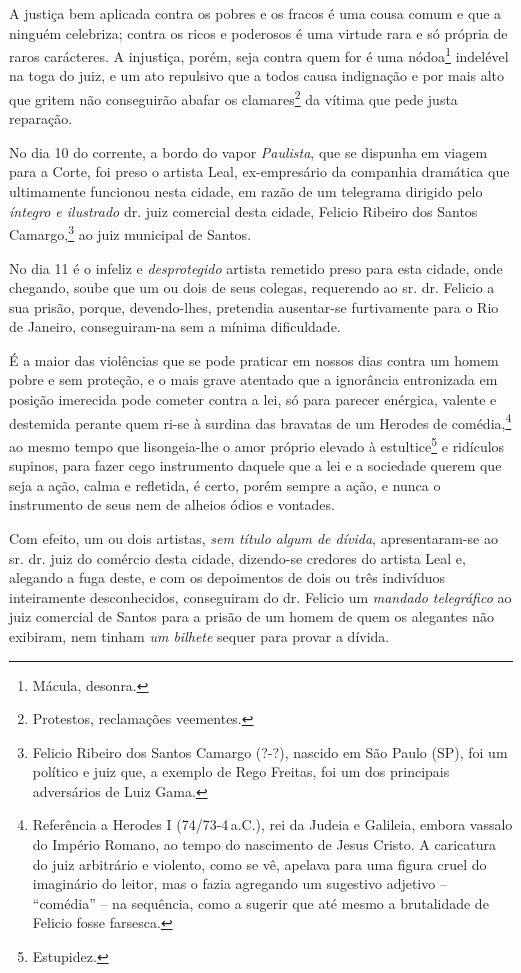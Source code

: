 A justiça bem aplicada contra os pobres e os fracos é uma cousa comum e
que a ninguém celebriza; contra os ricos e poderosos é uma virtude rara
e só própria de raros carácteres. A injustiça, porém, seja contra quem
for é uma nódoa\footnote{ Mácula, desonra.} indelével na toga do juiz,
e um ato repulsivo que a todos causa indignação e por mais alto que
gritem não conseguirão abafar os clamares\footnote{ Protestos,
  reclamações veementes.} da vítima que pede justa reparação.

No dia 10 do corrente, a bordo do vapor \emph{Paulista}, que se dispunha
em viagem para a Corte, foi preso o artista Leal, ex-empresário da
companhia dramática que ultimamente funcionou nesta cidade, em razão de
um telegrama dirigido pelo \emph{íntegro e ilustrado} dr. juiz comercial
desta cidade, Felicio Ribeiro dos Santos Camargo,\footnote{ Felicio
  Ribeiro dos Santos Camargo (?-?), nascido em São Paulo (SP), foi um
  político e juiz que, a exemplo de Rego Freitas, foi um dos principais
  adversários de Luiz Gama.} ao juiz municipal de Santos.

No dia 11 é o infeliz e \emph{desprotegido} artista remetido preso para
esta cidade, onde chegando, soube que um ou dois de seus colegas,
requerendo ao sr. dr. Felicio a sua prisão, porque, devendo-lhes,
pretendia ausentar-se furtivamente para o Rio de Janeiro, conseguiram-na
sem a mínima dificuldade.

É a maior das violências que se pode praticar em nossos dias contra um
homem pobre e sem proteção, e o mais grave atentado que a ignorância
entronizada em posição imerecida pode cometer contra a lei, só para
parecer enérgica, valente e destemida perante quem ri-se à surdina das
bravatas de um Herodes de comédia,\footnote{ Referência a Herodes I
  (74/73-4\,a.C.), rei da Judeia e Galileia, embora vassalo do
  Império Romano, ao tempo do nascimento de Jesus Cristo. A caricatura
  do juiz arbitrário e violento, como se vê, apelava para uma figura
  cruel do imaginário do leitor, mas o fazia agregando um sugestivo
  adjetivo -- ``comédia'' -- na sequência, como a sugerir que até mesmo a
  brutalidade de Felicio fosse farsesca.} ao mesmo tempo que
lisongeia-lhe o amor próprio elevado à estultice\footnote{ Estupidez.}
e ridículos supinos, para fazer cego instrumento daquele que a lei e a
sociedade querem que seja a ação, calma e refletida, é certo, porém
sempre a ação, e nunca o instrumento de seus nem de alheios ódios e
vontades.

Com efeito, um ou dois artistas, \emph{sem título algum de dívida},
apresentaram-se ao sr. dr. juiz do comércio desta cidade, dizendo-se
credores do artista Leal e, alegando a fuga deste, e com os depoimentos
de dois ou três indivíduos inteiramente desconhecidos, conseguiram do
dr. Felicio um \emph{mandado telegráfico} ao juiz comercial de Santos
para a prisão de um homem de quem os alegantes não exibiram, nem tinham
\emph{um bilhete} sequer para provar a dívida.

